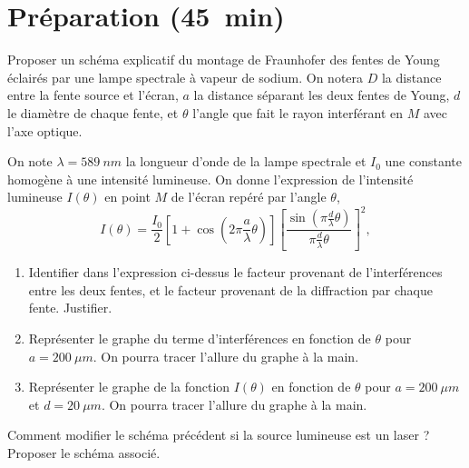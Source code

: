 



\section{Préparation (\SI{45}{min})}

\begin{protocole}
\item Proposer un schéma explicatif du montage de Fraunhofer des fentes de Young éclairés par une lampe spectrale à vapeur de sodium. On notera $D$ la distance entre la fente source et l’écran, $a$ la distance séparant les deux fentes de Young, $d$ le diamètre de chaque fente, et $\theta$ l’angle que fait le rayon interférant en $M$ avec l’axe optique.

\item On note $\lambda = \SI{589}{nm}$ la longueur d'onde de la lampe spectrale et $I_0$ une constante homogène à une intensité lumineuse. On donne l'expression de l'intensité lumineuse $I(\theta)$ en point $M$ de l'écran repéré par l'angle $\theta$,
\begin{equation}
  I(\theta) = \frac{I_0}{2} \left[1 + \cos\left( 2\pi \frac{a}{\lambda} \theta\right)\right] \left[ \frac{\sin (\pi \frac{d}{\lambda} \theta)}{\pi \frac{d}{\lambda} \theta} \right]^2,
\end{equation}
\begin{enumerate}
  \item Identifier dans l'expression ci-dessus le facteur provenant de l'interférences entre les deux fentes, et le facteur provenant de la diffraction par chaque fente. Justifier.
  \item Représenter le graphe du terme d'interférences en fonction de $\theta$ pour $a=\SI{200}{\mu m}$. On pourra tracer l'allure du graphe à la main.
  \item Représenter le graphe de la fonction $I(\theta)$ en fonction de $\theta$ pour $a=\SI{200}{\mu m}$ et $d=\SI{20}{\mu m}$. On pourra tracer l'allure du graphe à la main.
\end{enumerate}

\item Comment modifier le schéma précédent si la source lumineuse est un laser ? Proposer le schéma associé.
\end{protocole}


